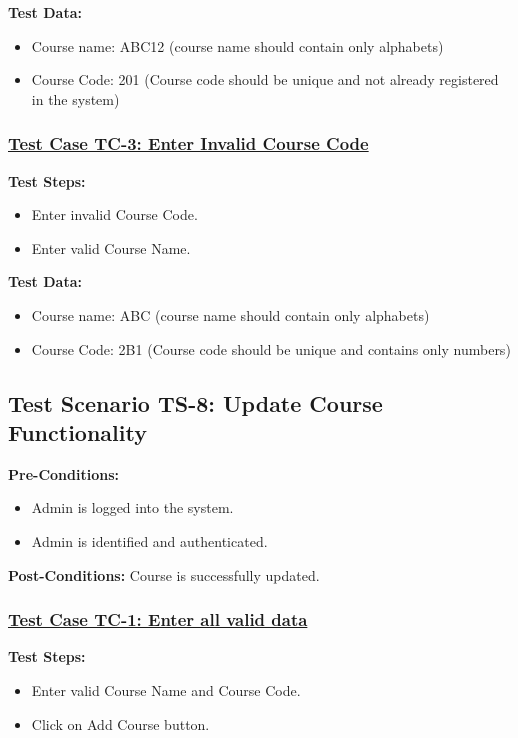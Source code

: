 \textbf{Test Data:}
\begin{itemize}

\item Course name: ABC12 (course name should contain only alphabets)
\item Course Code: 201 (Course code should be unique and not already registered in the system)

\end{itemize}

\subsubsection{\underline{Test Case TC-3: Enter Invalid Course Code}}
\textbf{Test Steps:}
\begin{itemize}

\item Enter invalid Course Code.
\item Enter valid Course Name.

\end{itemize}

\textbf{Test Data:}
\begin{itemize}

\item Course name: ABC (course name should contain only alphabets)
\item Course Code: 2B1 (Course code should be unique and contains only numbers)

\end{itemize}


\subsection{Test Scenario TS-8: Update Course Functionality}
\textbf{Pre-Conditions: } 
\begin{itemize}

\item Admin is logged into the system.
\item Admin is identified and authenticated.

\end{itemize}

\textbf{Post-Conditions: } Course is successfully updated.
\subsubsection{\underline{Test Case TC-1: Enter all valid data}}
\textbf{Test Steps:}
\begin{itemize}

\item Enter valid Course Name and Course Code.
\item Click on Add Course button.

\end{itemize}

